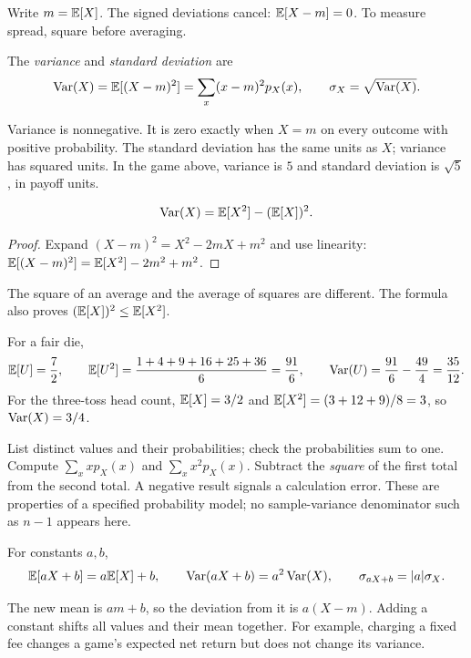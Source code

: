 Write $m=\mathbb E[X]$. The signed deviations cancel:
$\mathbb E[X-m]=0$. To measure spread, square before averaging.

\begin{definition}
The \emph{variance} and \emph{standard deviation} are
\[
 \operatorname{Var}(X)=\mathbb E[(X-m)^2]=\sum_x(x-m)^2p_X(x),
 \qquad \sigma_X=\sqrt{\operatorname{Var}(X)}.
\]
\end{definition}
Variance is nonnegative. It is zero exactly when $X=m$ on every outcome
with positive probability. The standard deviation has the same units as
$X$; variance has squared units. In the game above, variance is $5$
and standard deviation is $\sqrt5$, in payoff units.

\begin{proposition}
\[
 \operatorname{Var}(X)=\mathbb E[X^2]-(\mathbb E[X])^2.
\]
\end{proposition}
\begin{proof}
Expand $(X-m)^2=X^2-2mX+m^2$ and use linearity:
$\mathbb E[(X-m)^2]=\mathbb E[X^2]-2m^2+m^2$.
\end{proof}
The square of an average and the average of squares are different.
The formula also proves $(\mathbb E[X])^2\le\mathbb E[X^2]$.

\begin{example}
For a fair die,
\[
 \mathbb E[U]=\frac72,\qquad
 \mathbb E[U^2]=\frac{1+4+9+16+25+36}{6}=\frac{91}{6},
 \qquad
 \operatorname{Var}(U)=\frac{91}{6}-\frac{49}{4}=\frac{35}{12}.
\]
For the three-toss head count, $\mathbb E[X]=3/2$ and
$\mathbb E[X^2]=(3+12+9)/8=3$, so $\operatorname{Var}(X)=3/4$.
\end{example}

\begin{checkpoint}[title={A reliable calculation}]
List distinct values and their probabilities; check the probabilities
sum to one. Compute $\sum_x xp_X(x)$ and $\sum_x x^2p_X(x)$.
Subtract the \emph{square} of the first total from the second total.
A negative result signals a calculation error.
These are properties of a specified probability model; no sample-variance
denominator such as $n-1$ appears here.
\end{checkpoint}

\begin{proposition}
For constants $a,b$,
\[
 \mathbb E[aX+b]=a\mathbb E[X]+b,\qquad
 \operatorname{Var}(aX+b)=a^2\operatorname{Var}(X),\qquad
 \sigma_{aX+b}=|a|\sigma_X.
\]
\end{proposition}
The new mean is $am+b$, so the deviation from it is $a(X-m)$.
Adding a constant shifts all values and their mean together.
For example, charging a fixed fee changes a game's expected net return
but does not change its variance.

